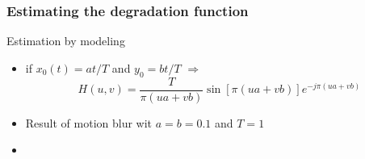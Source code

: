 \documentclass{beamer}
\begin{document}
\begin{frame}
\frametitle{Estimating the degradation function}
\begin{block}{Estimation by modeling}
\begin{itemize}
\item if $x_{0}(t) = at/T$ and $y_{0} = bt/T$ $\Rightarrow$
    $$H(u,v) = \frac{T}{\pi (ua+vb)} \sin[\pi(ua+vb)] e^{-j\pi(ua+vb)}  $$
\item Result of motion blur wit $a= b= 0.1$ and $T = 1$
\item[]
\end{itemize}
\end{block}
\end{frame}
\end{document}
